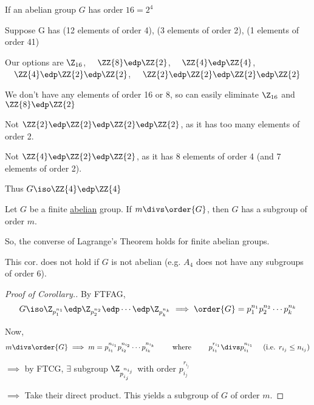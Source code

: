 \begin{example}
If an abelian group \(G\) has order \(16 = 2^4\)

Suppose G has (12 elements of order 4), (3 elements of order 2), (1 elements of order 41)

Our options are \(\Z_{16}\), \(\quad \ZZ{8}\edp\ZZ{2}\), \(\quad\ZZ{4}\edp\ZZ{4}\), \(\quad\ZZ{4}\edp\ZZ{2}\edp\ZZ{2}\), \(\quad\ZZ{2}\edp\ZZ{2}\edp\ZZ{2}\edp\ZZ{2}\)

We don't have any elements of order 16 or 8, so can easily eliminate \(\Z_{16}\) and \(\ZZ{8}\edp\ZZ{2}\)

Not \(\ZZ{2}\edp\ZZ{2}\edp\ZZ{2}\edp\ZZ{2}\), as it has too many elements of order 2.

Not \(\ZZ{4}\edp\ZZ{2}\edp\ZZ{2}\), as it has 8 elements of order 4 (and 7 elements of order 2).

Thus \(G \iso \ZZ{4}\edp\ZZ{4}\)
\end{example}

\begin{corollary}
Let \(G\) be a finite \uline{abelian} group. If \(m\divs \order{G}\), then \(G\) has a subgroup of order \(m\).
\end{corollary}

So, the converse of Lagrange's Theorem holds for finite abelian groups.

\begin{remark}
This cor. does not hold if \(G\) is not abelian (e.g. \(A_4\) does not have any subgroups of order \(6\)).
\end{remark}

\begin{proof}[Proof of Corollary.]

By FTFAG, \begin{align*}
G \iso \Z_{p_1^{n_1}} \edp \Z_{p_2^{n_2}} \edp \cdots \edp \Z_{p_k^{n_k}} \implies \order{G} = p_1^{n_1}p_2^{n_2}\cdots p_k^{n_k}
\end{align*}

Now, \begin{align*}
m\divs\order{G} \implies m = p_{i_1}^{n_{i_1}}p_{i_2}^{n_{i_2}}\cdots p_{i_k}^{n_{i_k}}
\qquad \text{ where } \qquad
p_{i_1}^{r_{i_1}} \divs p_{i_1}^{n_{i_1}} \quad \text{ (i.e. \(r_{i_j}\leq n_{i_j}\))}
\end{align*}

\(\implies\) by FTCG, \(\exists\) subgroup \(\Z_{p_{i_j}^{n_{i_j}}}\) with order \(p_{i_j}^{r_{i_j}}\)

\(\implies\) Take their direct product. This yields a subgroup of \(G\) of order \(m\).
\end{proof}

